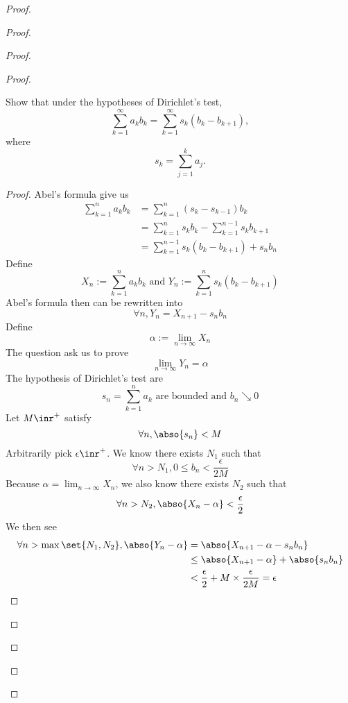 \documentclass{report}
\begin{document}
\begin{proof}
\begin{proof}
\begin{proof}
\begin{proof}
\begin{question}{}{}
Show that under the hypotheses of Dirichlet’s test,
\[
\sum_{k=1}^{\infty} a_k b_k = \sum_{k=1}^{\infty} s_k (b_k - b_{k+1}),
\]
where 
\[
s_k = \sum_{j=1}^{k} a_j.
\]
\end{question}
\begin{proof}
Abel's formula give us
\begin{align}
\sum_{k=1}^na_kb_k&=\sum_{k=1}^n (s_{k}-s_{k-1})b_k\\
&=\sum_{k=1}^n s_kb_k-\sum_{k=1}^{n-1} s_kb_{k+1}\\
&=\sum_{k=1}^{n-1}s_k(b_k-b_{k+1})+s_nb_n
\end{align}
Define 
\begin{equation}
X_n:=\sum_{k=1}^n a_kb_k\text{ and }Y_n:=\sum_{k=1}^{n}s_k(b_k-b_{k+1})
\end{equation}
Abel's formula then can be rewritten into
\begin{equation}
\forall n,Y_n=X_{n+1}-s_nb_n
\end{equation}
Define
\begin{equation}
\alpha :=\lim_{n\to\infty}X_n 
\end{equation}
The question ask us to prove
\begin{equation}
\lim_{n\to\infty}Y_n=\alpha 
\end{equation}
The hypothesis of Dirichlet's test are 
\begin{equation}
  s_n=\sum_{k=1}^n a_k\text{ are bounded and }b_n\searrow 0 
\end{equation}
Let $M\inr^+$ satisfy
\begin{equation}
\forall n, \abso{s_n}<M
\end{equation}
Arbitrarily pick $\epsilon\inr^+$. We know there exists $N_1$ such that
 \begin{equation}
\forall n>N_1, 0\leq b_n<\frac{\epsilon }{2M}
\end{equation}
Because  $\alpha =\lim_{n\to\infty}X_n$, we also know there exists $N_2$ such that
 \begin{equation}
\forall n>N_2, \abso{X_n-\alpha }<\frac{\epsilon }{2}
\end{equation}
We then see 
\begin{align}
  \forall n>\max \set{N_1,N_2}, \abso{Y_n-\alpha }&=\abso{X_{n+1}-\alpha -s_nb_n}\\
  &\leq \abso{X_{n+1}-\alpha }+\abso{s_nb_n}\\
  &<\frac{\epsilon}{2}+M\times \frac{\epsilon }{2M}=\epsilon 
\end{align}

\end{proof}
\end{proof}
\end{proof}
\end{proof}
\end{proof}
\end{document}
